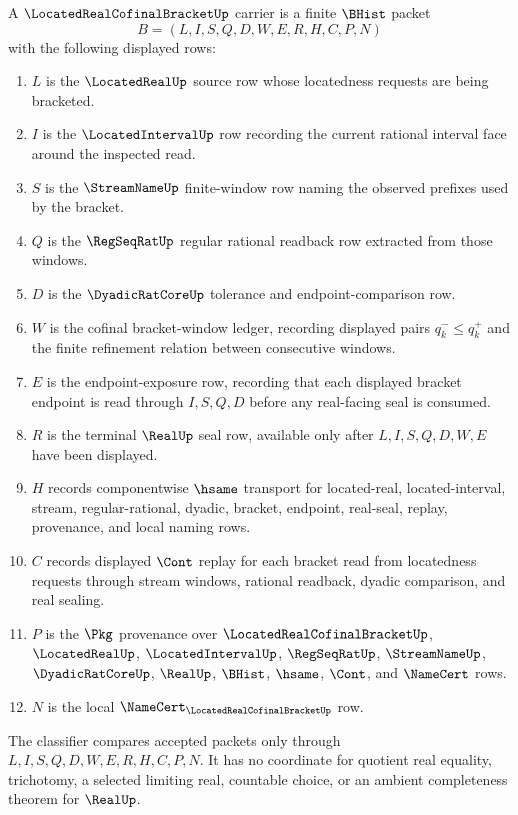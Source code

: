 \begin{definition}
\label{def:located-real-cofinal-bracket-carrier}
A $\LocatedRealCofinalBracketUp$ carrier is a finite $\BHist$ packet
$$
B=(L,I,S,Q,D,W,E,R,H,C,P,N)
$$
with the following displayed rows:
\begin{enumerate}
\item $L$ is the $\LocatedRealUp$ source row whose locatedness requests are being bracketed.
\item $I$ is the $\LocatedIntervalUp$ row recording the current rational interval face around the inspected read.
\item $S$ is the $\StreamNameUp$ finite-window row naming the observed prefixes used by the bracket.
\item $Q$ is the $\RegSeqRatUp$ regular rational readback row extracted from those windows.
\item $D$ is the $\DyadicRatCoreUp$ tolerance and endpoint-comparison row.
\item $W$ is the cofinal bracket-window ledger, recording displayed pairs $q^-_k \leq q^+_k$ and the finite refinement relation between consecutive windows.
\item $E$ is the endpoint-exposure row, recording that each displayed bracket endpoint is read through $I,S,Q,D$ before any real-facing seal is consumed.
\item $R$ is the terminal $\RealUp$ seal row, available only after $L,I,S,Q,D,W,E$ have been displayed.
\item $H$ records componentwise $\hsame$ transport for located-real, located-interval, stream, regular-rational, dyadic, bracket, endpoint, real-seal, replay, provenance, and local naming rows.
\item $C$ records displayed $\Cont$ replay for each bracket read from locatedness requests through stream windows, rational readback, dyadic comparison, and real sealing.
\item $P$ is the $\Pkg$ provenance over $\LocatedRealCofinalBracketUp$, $\LocatedRealUp$, $\LocatedIntervalUp$, $\RegSeqRatUp$, $\StreamNameUp$, $\DyadicRatCoreUp$, $\RealUp$, $\BHist$, $\hsame$, $\Cont$, and $\NameCert$ rows.
\item $N$ is the local $\NameCert_{\LocatedRealCofinalBracketUp}$ row.
\end{enumerate}
The classifier compares accepted packets only through $L,I,S,Q,D,W,E,R,H,C,P,N$. It has no coordinate for quotient real equality, trichotomy, a selected limiting real, countable choice, or an ambient completeness theorem for $\RealUp$.
\end{definition}

